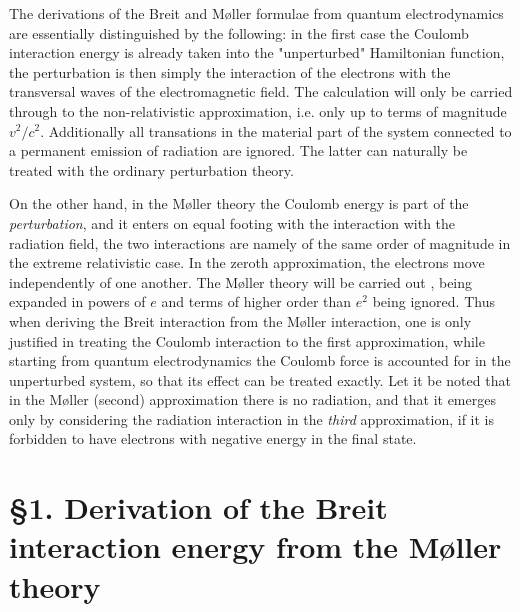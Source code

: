 \documentclass{article}
\begin{document}
The derivations of the Breit and Møller formulae from quantum electrodynamics are essentially distinguished by the following: in the first case the Coulomb interaction energy is already taken into the "unperturbed" Hamiltonian function, the perturbation is then simply the interaction of the electrons with the transversal waves of the electromagnetic field. The calculation will only be carried through to the non-relativistic approximation, i.e. only up to terms of magnitude $v^2/c^2$. Additionally all transations in the material part of the system connected to a permanent emission of radiation are ignored. The latter can naturally be treated with the ordinary perturbation theory.

On the other hand, in the Møller theory the Coulomb energy is part of the \textit{perturbation}, and it enters on equal footing with the interaction with the radiation field, the two interactions are namely of the same order of magnitude in the extreme relativistic case. In the zeroth approximation, the electrons move independently of one another. The Møller theory will be carried out , being expanded in powers of $e$ and terms of higher order than $e^2$ being ignored. Thus when deriving the Breit interaction from the Møller interaction, one is only justified in treating the Coulomb interaction to the first approximation, while starting from quantum electrodynamics the Coulomb force is accounted for in the unperturbed system, so that its effect can be treated exactly. Let it be noted that in the Møller (second) approximation there is no radiation, and that it emerges only by considering the radiation interaction in the \textit{third} approximation, if it is forbidden to have electrons with negative energy in the final state.

\section*{§1. Derivation of the Breit interaction energy from the Møller theory} 
\end{document}
